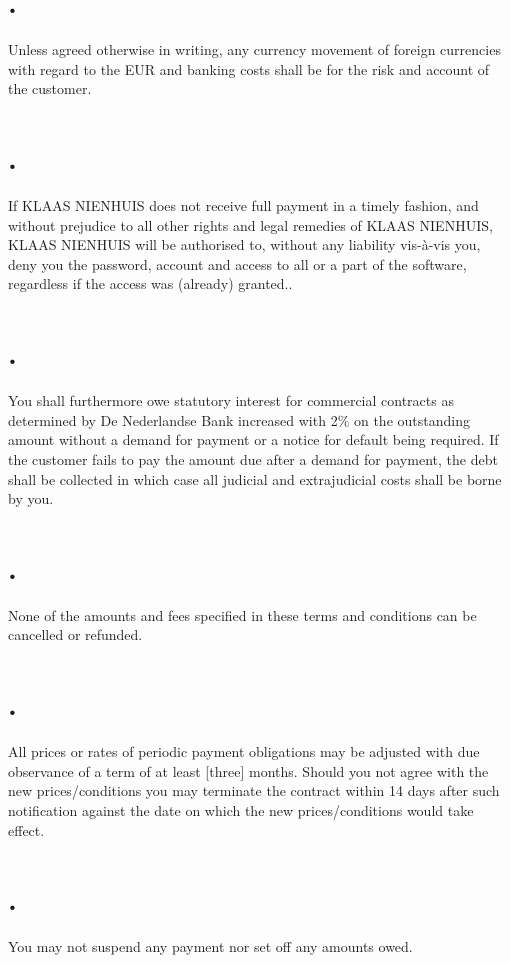 \documentclass[letterpaper,10pt,english]{sphinxmanual}
\begin{document}
\section{.}
\label{Payment:id2}
Unless agreed otherwise in writing, any currency movement of foreign currencies with regard to the EUR and banking costs shall be for the risk and account of the customer.


\section{.}
\label{Payment:id3}
If KLAAS NIENHUIS does not receive full payment in a timely fashion, and without prejudice to all other rights and legal remedies of KLAAS NIENHUIS, KLAAS NIENHUIS will be authorised to, without any liability vis-à-vis you, deny you the password, account and access to all or a part of the software, regardless if the access was (already) granted..


\section{.}
\label{Payment:id4}
You shall furthermore owe statutory interest for commercial contracts as determined by De Nederlandse Bank increased with 2\% on the outstanding amount without a demand for payment or a notice for default being required. If the customer fails to pay the amount due after a demand for payment, the debt shall be collected in which case all judicial and extrajudicial costs shall be borne by you.


\section{.}
\label{Payment:id5}
None of the amounts and fees specified in these terms and conditions can be cancelled or refunded.


\section{.}
\label{Payment:id6}
All prices or rates of periodic payment obligations may be adjusted with due observance of a term of at least {[}three{]} months. Should you not agree with the new prices/conditions you may terminate the contract within 14 days after such notification against the date on which the new prices/conditions would take effect.


\section{.}
\label{Payment:id7}
You may not suspend any payment nor set off any amounts owed.
\end{document}
